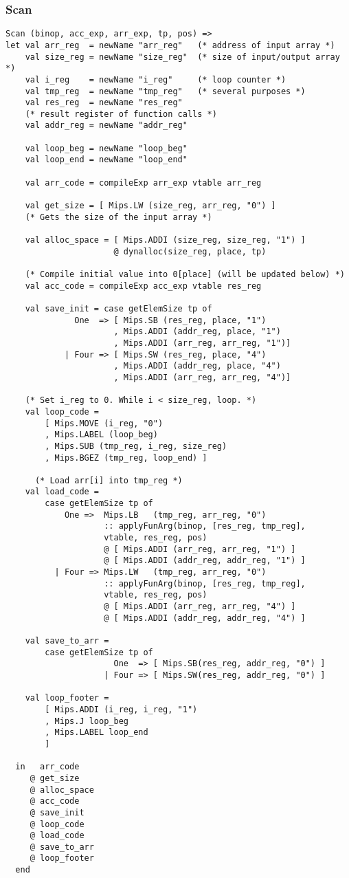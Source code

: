 \documentclass[12pt]{article}
\begin{document}
\subsubsection{Scan}
\begin{verbatim}
Scan (binop, acc_exp, arr_exp, tp, pos) =>
let val arr_reg  = newName "arr_reg"   (* address of input array *)
    val size_reg = newName "size_reg"  (* size of input/output array *)
    val i_reg    = newName "i_reg"     (* loop counter *)
    val tmp_reg  = newName "tmp_reg"   (* several purposes *)
    val res_reg  = newName "res_reg"   
    (* result register of function calls *)
    val addr_reg = newName "addr_reg"

    val loop_beg = newName "loop_beg"
    val loop_end = newName "loop_end"

    val arr_code = compileExp arr_exp vtable arr_reg

    val get_size = [ Mips.LW (size_reg, arr_reg, "0") ] 
    (* Gets the size of the input array *)

    val alloc_space = [ Mips.ADDI (size_reg, size_reg, "1") ]
                      @ dynalloc(size_reg, place, tp)

    (* Compile initial value into 0[place] (will be updated below) *)
    val acc_code = compileExp acc_exp vtable res_reg 

    val save_init = case getElemSize tp of
              One  => [ Mips.SB (res_reg, place, "1")
                      , Mips.ADDI (addr_reg, place, "1")
                      , Mips.ADDI (arr_reg, arr_reg, "1")]
            | Four => [ Mips.SW (res_reg, place, "4")
                      , Mips.ADDI (addr_reg, place, "4")
                      , Mips.ADDI (arr_reg, arr_reg, "4")]

    (* Set i_reg to 0. While i < size_reg, loop. *)
    val loop_code =
        [ Mips.MOVE (i_reg, "0")
        , Mips.LABEL (loop_beg)
        , Mips.SUB (tmp_reg, i_reg, size_reg)
        , Mips.BGEZ (tmp_reg, loop_end) ]

      (* Load arr[i] into tmp_reg *)
    val load_code =
        case getElemSize tp of
            One =>  Mips.LB   (tmp_reg, arr_reg, "0")
                    :: applyFunArg(binop, [res_reg, tmp_reg], 
                    vtable, res_reg, pos)
                    @ [ Mips.ADDI (arr_reg, arr_reg, "1") ]
                    @ [ Mips.ADDI (addr_reg, addr_reg, "1") ]
          | Four => Mips.LW   (tmp_reg, arr_reg, "0")
                    :: applyFunArg(binop, [res_reg, tmp_reg], 
                    vtable, res_reg, pos)
                    @ [ Mips.ADDI (arr_reg, arr_reg, "4") ]
                    @ [ Mips.ADDI (addr_reg, addr_reg, "4") ]

    val save_to_arr =
        case getElemSize tp of
                      One  => [ Mips.SB(res_reg, addr_reg, "0") ]
                    | Four => [ Mips.SW(res_reg, addr_reg, "0") ]

    val loop_footer =
        [ Mips.ADDI (i_reg, i_reg, "1")
        , Mips.J loop_beg
        , Mips.LABEL loop_end
        ]

  in   arr_code 
     @ get_size
     @ alloc_space
     @ acc_code 
     @ save_init
     @ loop_code 
     @ load_code 
     @ save_to_arr
     @ loop_footer
  end
\end{verbatim}
\hfill
\hfill
\end{document}
